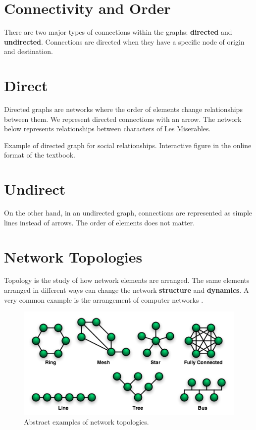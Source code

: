 \documentclass[
]{book}
\begin{document}
\hypertarget{connectivity-and-order}{%
\section{Connectivity and Order}\label{connectivity-and-order}}

There are two major types of connections within the graphs: \textbf{directed} and \textbf{undirected}. Connections are directed when they have a specific node of origin and destination.

\hypertarget{direct}{%
\section{Direct}\label{direct}}

Directed graphs are networks where the order of elements change relationships between them. We represent directed connections with an arrow. The network below represents relationships between characters of Les Miserables.

\label{fig:unnamed-chunk-11}Example of directed graph for social relationships. Interactive figure in the online format of the textbook.

\hypertarget{undirect}{%
\section{Undirect}\label{undirect}}

On the other hand, in an undirected graph, connections are represented as simple lines instead of arrows. The order of elements does not matter.

\hypertarget{network-topologies}{%
\section{Network Topologies}\label{network-topologies}}

Topology is the study of how network elements are arranged. The same elements arranged in different ways can change the network \textbf{structure} and \textbf{dynamics}. A very common example is the arrangement of computer networks \citep{wikibooksCommunicationNetworksNetwork2018}.

\begin{figure}
\includegraphics[width=0.8\linewidth]{images/08-network_topologies} \caption{Abstract examples of network topologies.}\label{fig:unnamed-chunk-12}
\end{figure}
\end{document}
